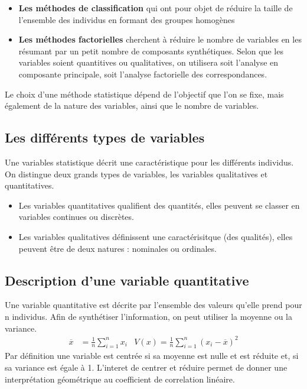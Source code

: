 \documentclass[a4paper]{article}
\begin{document}
\begin{itemize}
    \item[] \textbf{Les méthodes de classification} qui ont pour objet de réduire la taille de l'ensemble des individus en formant des groupes homogènes
    \item[] \textbf{Les méthodes factorielles} cherchent à réduire le nombre de variables en les résumant par un petit nombre de composants synthétiques.
        Selon que les variables soient quantitives ou qualitatives, on utilisera soit l'analyse en composante principale, soit l'analyse factorielle des
        correspondances. \\
\end{itemize}
Le choix d'une méthode statistique dépend de l'objectif que l'on se fixe, mais également de la nature des variables, ainsi que le nombre de variables.

\subsection{Les différents types de variables}
Une variables statistique décrit une caractéristique pour les différents individus. On distingue deux grands types de variables, les variables
qualitatives et quantitatives.
\begin{itemize}
    \item Les variables quantitatives qualifient des quantités, elles peuvent se classer en variables continues ou discrètes.
    \item Les variables qualitatives définissent une caractérisitque (des qualités), elles peuvent être de deux natures : nominales ou ordinales.
\end{itemize}
\subsection{Description d'une variable quantitative}
Une variable quantitative est décrite par l'ensemble des valeurs qu'elle prend pour n individus. Afin de synthétiser l'information, on peut utiliser la
moyenne ou la variance.
\begin{align*}
    \overline{x} &= \frac{1}{n}\sum_{i = 1}^{n} x_i & V(x) = \frac{1}{n} \sum_{i = 1}^{n} \left( x_i - \overline{x} \right)^2
\end{align*}
Par définition une variable est centrée si sa moyenne est nulle et est réduite et, si sa variance est égale à 1. L'interet de centrer et réduire permet de
donner une interprétation géométrique au coefficient de correlation linéaire.
\end{document}
